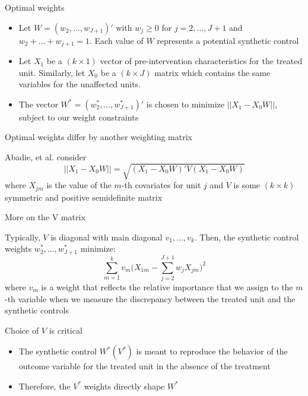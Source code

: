 \documentclass{beamer}
\begin{document}
\begin{frame}{Optimal weights}
	
	\begin{itemize}
	\item Let $W=(w_2, \dots, w_{J+1})'$ with $w_j\geq 0$ for $j=2, \dots, J+1$ and $w_2+\dots+w_{j+1}=1$. Each value of $W$ represents a potential synthetic control
	\item Let $X_1$ be a $(k\times 1)$ vector of pre-intervention characteristics for the treated unit.  Similarly, let $X_0$ be a $(k\times J)$ matrix which contains the same variables for the unaffected units.
	\item The vector $W^*=(w_2^*, \dots, w_{J+1}^*)'$ is chosen to minimize $||X_1-X_0W||$, subject to our weight constraints
	\end{itemize}
\end{frame}

\begin{frame}{Optimal weights differ by another weighting matrix}
	
Abadie, et al. consider $$||X_1 - X_0W||=\sqrt{(X_1-X_0W)'V(X_1-X_0W)}$$where $X_{jm}$ is the value of the $m$-th covariates for unit $j$ and $V$ is some $(k\times k)$ symmetric and positive semidefinite matrix

\end{frame}

\begin{frame}{More on the V matrix}

Typically, $V$ is diagonal with main diagonal $v_1, \dots, v_k$.  Then, the synthetic control weights $w_2^*, \dots, w_{J+1}^*$ minimize: $$\sum_{m=1}^k v_m \bigg(X_{1m} - \sum_{j=2}^{J+1}w_jX_{jm}\bigg)^2$$ where $v_m$ is a weight that reflects the relative importance that we assign to the $m$-th variable when we measure the discrepancy between the treated unit and the synthetic controls

\end{frame}

\begin{frame}{Choice of $V$ is critical}
	
		\begin{itemize}
		\item The synthetic control $W^*(V^*)$ is meant to reproduce the behavior of the outcome variable for the treated unit in the absence of the treatment
		\item Therefore, the $V^*$ weights directly shape $W^*$
		\end{itemize}
\end{frame}
\end{document}
